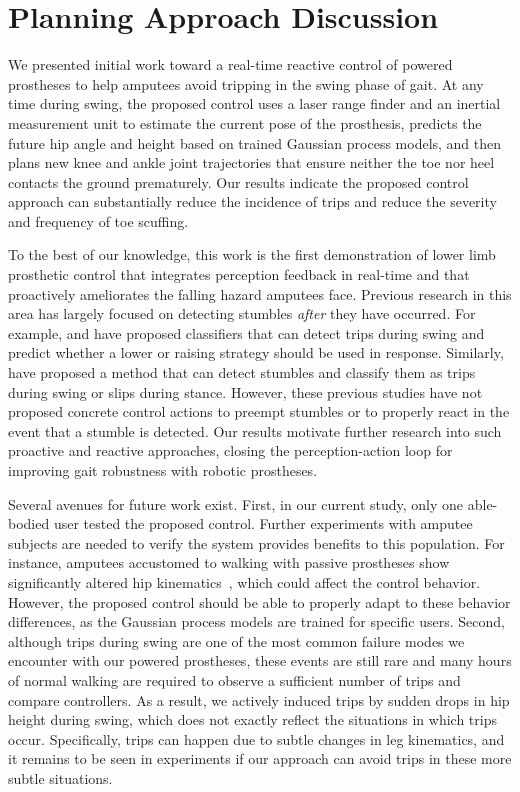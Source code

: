 \section{Planning Approach Discussion}\label{sec:swing_control_planning_discuss}

We presented initial work toward a real-time reactive control of powered
prostheses to help amputees avoid tripping in the swing phase of gait. At any
time during swing, the proposed control uses a laser range finder and an
inertial measurement unit to estimate the current pose of the prosthesis,
predicts the future hip angle and height based on trained Gaussian process
models, and then plans new knee and ankle joint trajectories that ensure neither
the toe nor heel contacts the ground prematurely. Our results indicate the
proposed control approach can substantially reduce the incidence of trips and
reduce the severity and frequency of toe scuffing.

To the best of our knowledge, this work is the first demonstration of lower limb
prosthetic control that integrates perception feedback in real-time and that
proactively ameliorates the falling hazard amputees face. Previous research in
this area has largely focused on detecting stumbles \emph{after} they have
occurred. For example, \citet{lawson2010stumble} and \citet{shirota2014recovery}
have proposed classifiers that can detect trips during swing and predict whether
a lower or raising strategy should be used in response. Similarly,
\citet{zhang2011towards} have proposed a method that can detect stumbles and
classify them as trips during swing or slips during stance. However, these
previous studies have not proposed concrete control actions to preempt stumbles
or to properly react in the event that a stumble is detected. Our results
motivate further research into such proactive and reactive approaches, closing
the perception-action loop for improving gait robustness with robotic
prostheses.

Several avenues for future work exist. First, in our current study, only one
able-bodied user tested the proposed control. Further experiments with amputee
subjects are needed to verify the system provides benefits to this population.
For instance, amputees accustomed to walking with passive prostheses show
significantly altered hip kinematics~\citep{jaegers1995prosthetic}, which could
affect the control behavior. However, the proposed control should be able to
properly adapt to these behavior differences, as the Gaussian process models are
trained for specific users. Second, although trips during swing are one of the
most common failure modes we encounter with our powered prostheses, these events
are still rare and many hours of normal walking are required to observe a
sufficient number of trips and compare controllers. As a result, we actively
induced trips by sudden drops in hip height during swing, which does not exactly
reflect the situations in which trips occur.  Specifically, trips can happen due
to subtle changes in leg kinematics, and it remains to be seen in experiments if
our approach can avoid trips in these more subtle situations.

